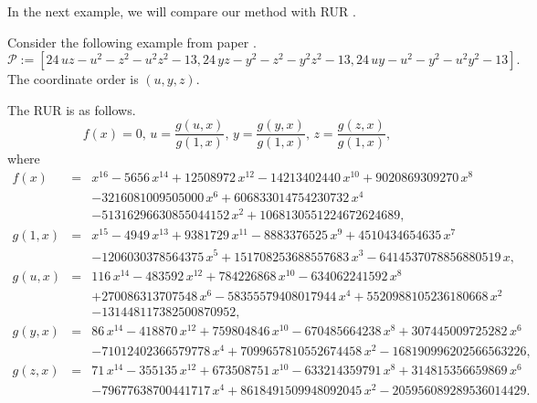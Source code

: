 \documentclass[amsthm]{JSC_LaTex_2007_Mar_12/elsart}
\begin{document}
In the next example, we will compare our method with RUR \cite{rur}.
\begin{exmp} Consider the following example from paper \cite{rur}.
$\mathcal{P}:=[24\,uz-{u}^{2}-{z}^{2}-{u}^{2}{z}^{2}-13,24\,yz-{y}^{2}-{z}^{2}-{y}^{
2}{z}^{2}-13,24\,uy-{u}^{2}-{y}^{2}-{u}^{2}{y}^{2}-13].$ The
coordinate order is $(u,y,z)$.

The RUR is as follows.
$$f(x)=0,\,u=\frac{g(u,x)}{g(1,x)},\,y=\frac{g(y,x)}{g(1,x)},\,z=\frac{g(z,x)}{g(1,x)},$$
where
\begin{eqnarray}
f(x)&=&{x}^{16}-5656\,{x}^{14}+12508972\,{x}^{12}-
14213402440\,{x}^{10}
+9020869309270\,{x}^{8}\nonumber\\&&-3216081009505000\,{x}^{6}
+606833014754230732\,{x}^{4}\nonumber\\ &&-51316296630855044152\,{x}^{2}+1068130551224672624689,\nonumber\\
g(1,x)&=&{x}^{15}-4949
\,{x}^{13}+9381729\,{x}^{11}-8883376525\,{x}^{9}+4510434654635\,{x}^{7
}\nonumber\\&&-1206030378564375\,{x}^{5}+151708253688557683\,{x}^{3}-
6414537078856880519\,x,\nonumber\\
g(u,x)&=&116\,{x}^{14}-483592\,{x}^{12}+
784226868\,{x}^{10}-634062241592\,{x}^{8}\nonumber\\ &&+270086313707548\,{x}^{6}-
58355579408017944\,{x}^{4}+5520988105236180668\,{x}^{2}\nonumber\\ &&-131448117382500870952,\nonumber\\
g(y,x)&=&86\,{x}^{14}
-418870\,{x}^{12}+759804846\,{x}^{10}-670485664238\,{x}^{8}+
307445009725282\,{x}^{6}\nonumber\\ &&-71012402366579778\,{x}^{4}+
7099657810552674458\,{x}^{2}-168190996202566563226,\nonumber\\
g(z,x)&=&71\,{x}^{14}-355135\,{x}^{12}+673508751\,{x}^{10
}-633214359791\,{x}^{8}+314815356659869\,{x}^{6}\nonumber\\ &&-79677638700441717\,{x
}^{4}+8618491509948092045\,{x}^{2}-205956089289536014429.\nonumber
\end{eqnarray}


\end{exmp}
\end{document}
